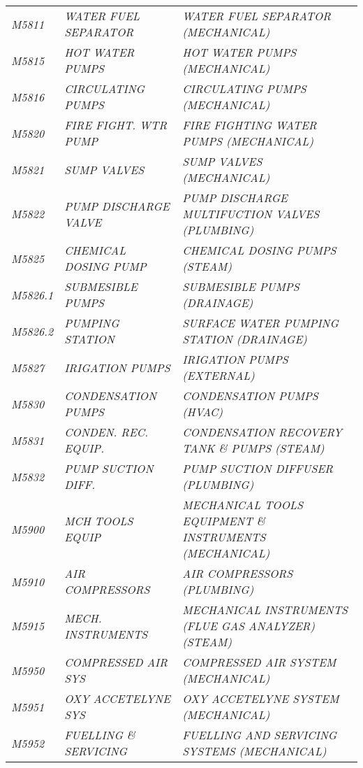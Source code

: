 \begin{landscape}
\begin{longtable}[l]{l%
                  l|%
                  l|}
\itshape M5811       &\itshape WATER FUEL SEPARATOR   &\itshape WATER FUEL SEPARATOR (MECHANICAL)   \\
\itshape M5815       &\itshape HOT WATER PUMPS   &\itshape HOT WATER PUMPS (MECHANICAL)   \\
\itshape M5816       &\itshape CIRCULATING PUMPS   &\itshape CIRCULATING PUMPS (MECHANICAL)   \\
\itshape M5820       &\itshape FIRE FIGHT. WTR PUMP   &\itshape FIRE FIGHTING WATER PUMPS (MECHANICAL)   \\
\itshape M5821       &\itshape SUMP VALVES   &\itshape SUMP VALVES (MECHANICAL)   \\
\itshape M5822       &\itshape PUMP DISCHARGE VALVE   &\itshape PUMP DISCHARGE MULTIFUCTION VALVES (PLUMBING)   \\
\itshape M5825       &\itshape CHEMICAL DOSING PUMP   &\itshape CHEMICAL DOSING PUMPS (STEAM)   \\
\itshape M5826.1     &\itshape SUBMESIBLE PUMPS   &\itshape SUBMESIBLE PUMPS (DRAINAGE)   \\
\itshape M5826.2     &\itshape PUMPING STATION   &\itshape SURFACE WATER PUMPING STATION (DRAINAGE)   \\
\itshape M5827       &\itshape IRIGATION PUMPS   &\itshape IRIGATION PUMPS (EXTERNAL)   \\
\itshape M5830       &\itshape CONDENSATION PUMPS   &\itshape CONDENSATION PUMPS (HVAC)   \\
\itshape M5831       &\itshape CONDEN. REC. EQUIP.   &\itshape CONDENSATION RECOVERY TANK \& PUMPS (STEAM)   \\
\itshape M5832       &\itshape PUMP SUCTION DIFF.   &\itshape PUMP SUCTION DIFFUSER (PLUMBING)   \\
\itshape M5900       &\itshape MCH TOOLS EQUIP   &\itshape MECHANICAL TOOLS EQUIPMENT \& INSTRUMENTS (MECHANICAL)   \\
\itshape M5910       &\itshape AIR COMPRESSORS   &\itshape AIR COMPRESSORS (PLUMBING)   \\
\itshape M5915       &\itshape MECH. INSTRUMENTS   &\itshape MECHANICAL INSTRUMENTS (FLUE GAS ANALYZER) (STEAM)   \\
\itshape M5950       &\itshape COMPRESSED AIR SYS   &\itshape COMPRESSED AIR SYSTEM (MECHANICAL)   \\
\itshape M5951       &\itshape OXY ACCETELYNE SYS   &\itshape OXY ACCETELYNE SYSTEM (MECHANICAL)   \\
\itshape M5952       &\itshape FUELLING \& SERVICING   &\itshape FUELLING AND SERVICING SYSTEMS (MECHANICAL)   \\

\end{longtable}
\end{landscape}
